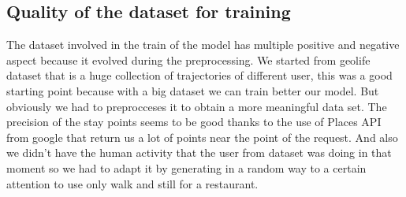 \documentclass[../../main]{subfiles}
\begin{document}
\label{ss:quality-training-dataset}
\subsection{Quality of the dataset for training}

The dataset involved in the train of the model has multiple positive and negative aspect because it evolved during the preprocessing.
We started from geolife dataset that is a huge collection of trajectories of different user, this was a good starting point 
because with a big dataset we can train better our model. But obviously we had to preprocceses it to obtain a more meaningful data set. 
The precision of the stay points seems to be good thanks to the use of Places API from google that return us a lot of points near the point of the request.
And also we didn't have the human activity that the user from dataset was doing in that moment so we had to adapt it by generating in a random way to a certain
attention to use only walk and still for a restaurant.
\end{document}
